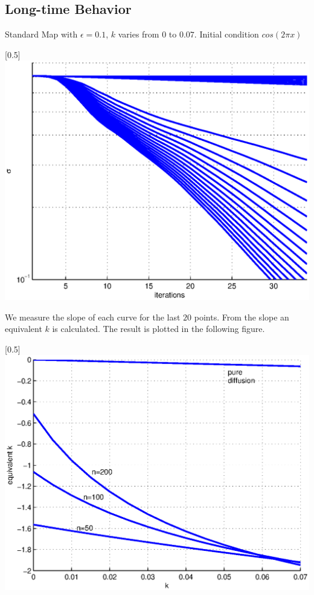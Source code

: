 \subsection{Long-time Behavior}

Standard Map with $\epsilon = 0.1$, $k$ varies from $0$ to $0.07$. Initial condition $cos(2\pi x)$

\centerline{\scalebox{0.5}[0.5]{\includegraphics{standardmap_epsilon_0.2_sigma_compare.eps}}}

We measure the slope of each curve for the last $20$ points. From the slope an equivalent $k$ is calculated. The result is plotted in the following figure.





\centerline{\scalebox{0.5}[0.5]{\includegraphics{standardmap_epsilon_0.2_kcompare.eps}}}


